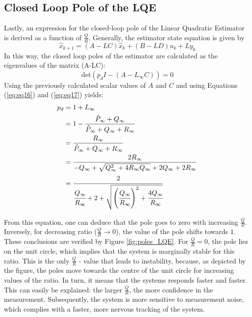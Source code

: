 \documentclass[a4paper,kul]{kulakarticle} %
\begin{document}
\subsection{Closed Loop Pole of the LQE}
Lastly, an expression for the closed-loop pole of the Linear Quadratic Estimator is derived as a function of $\frac{Q}{R}$. Generally, the estimator state equation is given by 
\begin{equation}
	\hat{x}_{k+1} = (A-LC) \hat{x}_k + (B-LD) u_k + L y_k
\end{equation}
In this way, the closed loop poles of the estimator are calculated as the eigenvalues of the matrix (A-LC):
\begin{equation}
	\text{det}(p_d I - (A-L_\infty C)) = 0
\end{equation}
Using the previously calculated scalar values of $A$ and $C$ and using Equations (\ref{eq:eq16}) and (\ref{eq:eq17}) yields:
\begin{equation}
	\begin{split}
		p_d &= 1 + L_\infty \\
		&= 1 - \frac{\hat{P}_\infty + Q_\infty}{\hat{P}_\infty + Q_\infty + R_\infty} \\
		&= \frac{R_\infty}{\hat{P}_\infty + Q_\infty + R_\infty} \\
		&= \frac{2R_\infty}{-Q_\infty + \sqrt{Q_\infty^2 + 4R_\infty Q_\infty} + 2Q_\infty + 2R_\infty} \\
		&= \cfrac{2}{\cfrac{Q_\infty}{R_\infty} + 2 + \sqrt{\left(\cfrac{Q_\infty}{R_\infty}\right)^2 + \cfrac{4Q_\infty}{R_\infty}}}
	\end{split}
\end{equation}

\noindent From this equation, one can deduce that the pole goes to zero with increasing $\frac{Q}{R}$. Inversely, for decreasing ratio ($\frac{Q}{R} \rightarrow 0$), the value of the pole shifts towards $1$. These conclusions are verified by Figure \ref{fig:poles_LQE}. For $\frac{Q}{R} = 0$, the pole lies on the unit circle, which implies that the system is marginally stable for this ratio. This is the only $\frac{Q}{R}$ - value that leads to instability, because, as depicted by the figure, the poles move towards the centre of the unit circle for increasing values of the ratio. In turn, it means that the systems responds faster and faster. This can easily be explained: the larger $\frac{Q}{R}$, the more confidence in the measurement. Subsequently, the system is more sensitive to measurement noise, which complies with a faster, more nervous tracking of the system.
\end{document}
